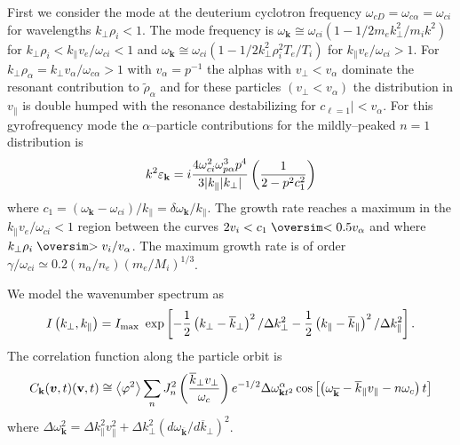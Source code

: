 \documentclass[a4paper,openany,12pt]{book}
\def\nms{\mathsurround=0pt}
\def\gtsim{\mathrel{\mathpalette\oversim>}} %
\def\ltsim{\mathrel{\mathpalette\oversim<}} %
\def\oversim#1#2{\lower 2pt\vbox{\baselineskip 0pt \lineskip 1pt
    \ialign{$\nms#1\hfil##\hfil$\crcr#2\crcr\sim\crcr}}}
\begin{document}
First we consider the mode at the deuterium cyclotron frequency $\omega_{cD}=\omega_{c\alpha}=\omega_{ci}$ for wavelengths $k_\perp\rho_i < 1$. The mode frequency is $\omega_{\mathbf k}\cong\omega_{ci}(1-1/2m_e k^2_\perp/m_i k^2)$ for $k_\perp\rho_i<k_\| v_e/\omega_{ci}<1$ and $\omega_{\mathbf{k}}\cong\omega_{ci}(1-1/2 k^2_\perp\rho_i^2 T_e/T_i)$ for $k_\| v_e/\omega_{ci}>1$. For $k_\perp\rho_\alpha=k_\perp v_\alpha/\omega_{c\alpha}>1$ with $v_\alpha=p^{-1}$ the alphas with $v_\perp<v_\alpha$ dominate the resonant contribution to $\widetilde\rho_\alpha$ and for these particles $(v_\perp< v_\alpha)$ the distribution in $v_\|$ is double humped with the resonance destabilizing for $c_{\ell=1}| < v_\alpha$. For this gyrofrequency mode the $\alpha$--particle contributions for the mildly--peaked $n=1$ distribution is
\begin{equation}
k^2\varepsilon_{\mathbf{k}}=i{4\omega^2_{ci}\omega^3_{p\alpha}p^4\over 3|k_\||k_\perp|}\left({1\over 2-p^2 c^2_1}\right)\label{E7.3}
\end{equation}
where $c_1=(\omega_{\mathbf{k}}-\omega_{ci})/k_\|=\delta\omega_{\mathbf{k}}/k_\|$. 
The growth rate reaches a maximum in the $k_\| v_e/\omega_{ci}<1$ region between the curves $2v_i<c_1\ltsim 0.5 v_\alpha$ and where $k_\perp\rho_i\gtsim v_i/v_\alpha$. The maximum growth rate is of order $\gamma/\omega_{ci}\simeq 0.2(n_\alpha/n_e)(m_e/M_i)^{1/3}$.

We model the wavenumber spectrum as 
\begin{equation}
I\left(k_\perp, k_\|\right)=I_{\rm max}\ \exp\left[-{1\over 2}\left(k_\perp-\overline k_\perp\right)^2/\Delta k^2_\perp-{1\over 2}\left(k_\|-\overline k_\|\right)^2/\Delta k^2_\|\right].\label{E7.4}
\end{equation}
The correlation function along the particle orbit is
\begin{equation}
C_{\mathbf{k}}(\bm{v},t)(\mathbf{v},t)\cong\left<\varphi^2\right>\sum_n J^2_n\left({\overline k_\perp v_\perp\over\omega_c}\right) e^{-1/2}\Delta\omega^\alpha_{\mathbf{k} t^2}\cos\left[\left(\omega_{\overline{\mathbf{k}}}-\overline k_\| v_\|-n\omega_c\right) t\right]\label{E7.5}
\end{equation}
where $\Delta\omega^2_{\mathbf k}=\Delta k^2_\| v^2_\|+\Delta k^2_\perp\left(d\omega_{\overline{\mathbf k}}/
d\overline k_\perp\right)^2$.\\[3pt]
\end{document}
